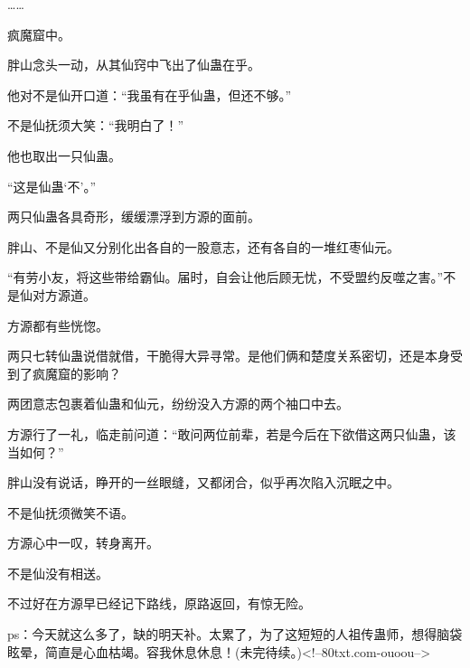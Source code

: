 \begin{this_body}
……

疯魔窟中。

胖山念头一动，从其仙窍中飞出了仙蛊在乎。

他对不是仙开口道：“我虽有在乎仙蛊，但还不够。”

不是仙抚须大笑：“我明白了！”

他也取出一只仙蛊。

“这是仙蛊‘不’。”

两只仙蛊各具奇形，缓缓漂浮到方源的面前。

胖山、不是仙又分别化出各自的一股意志，还有各自的一堆红枣仙元。

“有劳小友，将这些带给霸仙。届时，自会让他后顾无忧，不受盟约反噬之害。”不是仙对方源道。

方源都有些恍惚。

两只七转仙蛊说借就借，干脆得大异寻常。是他们俩和楚度关系密切，还是本身受到了疯魔窟的影响？

两团意志包裹着仙蛊和仙元，纷纷没入方源的两个袖口中去。

方源行了一礼，临走前问道：“敢问两位前辈，若是今后在下欲借这两只仙蛊，该当如何？”

胖山没有说话，睁开的一丝眼缝，又都闭合，似乎再次陷入沉眠之中。

不是仙抚须微笑不语。

方源心中一叹，转身离开。

不是仙没有相送。

不过好在方源早已经记下路线，原路返回，有惊无险。

ps：今天就这么多了，缺的明天补。太累了，为了这短短的人祖传蛊师，想得脑袋眩晕，简直是心血枯竭。容我休息休息！(未完待续。)<!--80txt.com-ouoou-->

\end{this_body}

